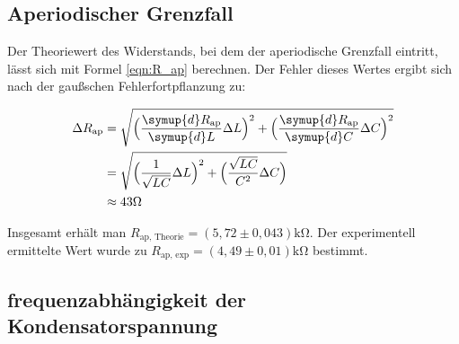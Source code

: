 \subsection{Aperiodischer Grenzfall}
\label{subsec:AuswertungB}

Der Theoriewert des Widerstands, bei dem der aperiodische Grenzfall eintritt, lässt sich mit Formel \eqref{eqn:R_ap} berechnen.
Der Fehler dieses Wertes ergibt sich nach der gaußschen Fehlerfortpflanzung zu:

\begin{align*}
  \label{eqn:err_R_ap}
  \Delta R_{\text{ap}} &= \sqrt{\Bigl(\frac{\symup{d}R_{\text{ap}}}{\symup{d}L}\Delta L \Bigr)^2+\Bigl(\frac{\symup{d}R_{\text{ap}}}{\symup{d}C}\Delta C\Bigr)^2} \\
  &= \sqrt{\Bigl(\frac{1}{\sqrt{LC}}\Delta L\Bigr)^2+\Bigl(\frac{\sqrt{LC}}{C^2}\Delta C\Bigr)} \\
  &\approx 43 \unit{\ohm}
\end{align*}

Insgesamt erhält man $R_{\text{ap, Theorie}} = (5,72 \pm 0,043) \unit{\kilo\ohm}$. Der experimentell ermittelte Wert wurde 
zu $R_{\text{ap, exp}} = (4,49 \pm 0,01) \unit{\kilo\ohm}$ bestimmt.

\subsection{frequenzabhängigkeit der Kondensatorspannung}
\label{subsec:AuswertungC}

